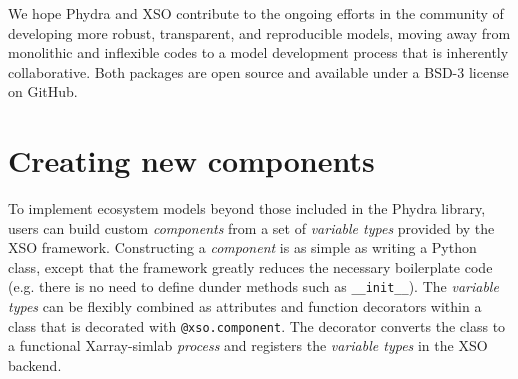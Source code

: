 \documentclass[journal abbreviation, manuscript]{copernicus}
\begin{document}
We hope Phydra and XSO contribute to the ongoing efforts in the community of developing more robust, transparent, and reproducible models, moving away from monolithic and inflexible codes to a model development process that is inherently collaborative. Both packages are open source and available under a BSD-3 license on GitHub.





















\appendix


\section{Creating new components}  \label{Appendix:CreatingXSOComponent}

To implement ecosystem models beyond those included in the Phydra library, users can build custom \textit{components} from a set of \textit{variable types} provided by the XSO framework. Constructing a \textit{component} is as simple as writing a Python class, except that the framework greatly reduces the necessary boilerplate code (e.g. there is no need to define dunder methods such as \texttt{\_\_init\_\_}). The \textit{variable types} can be flexibly combined as attributes and function decorators within a class that is decorated with \texttt{@xso.component}. The decorator converts the class to a functional Xarray-simlab \textit{process} and registers the \textit{variable types} in the XSO backend.
\end{document}
